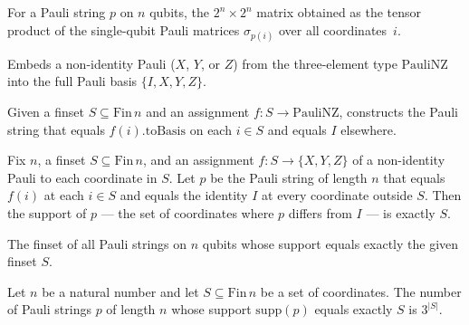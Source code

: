 \begin{definition}
\label{pauliMatrix}
\leanok
{}
For a Pauli string $p$ on $n$ qubits, the $2^n\times 2^n$ matrix obtained as the
tensor product of the single-qubit Pauli matrices $\sigma_{p(i)}$ over all coordinates~$i$.
\end{definition}

\begin{definition}
\label{PauliNZ.toBasis}
\leanok
{}
Embeds a non-identity Pauli ($X$, $Y$, or $Z$) from the three-element type
$\mathrm{PauliNZ}$ into the full Pauli basis $\{I,X,Y,Z\}$.
\end{definition}

\begin{definition}
\label{mkWithSupport}
\leanok
{}
Given a finset $S \subseteq \mathrm{Fin}\,n$ and an assignment $f : S \to \mathrm{PauliNZ}$,
constructs the Pauli string that equals $f(i).\mathrm{toBasis}$ on each $i \in S$ and equals $I$
elsewhere.
\end{definition}

\begin{lemma}
\label{support_mkWithSupport}
\leanok
{}
Fix $n$, a finset $S \subseteq \mathrm{Fin}\,n$, and an assignment $f : S \to \{X,Y,Z\}$
of a non-identity Pauli to each coordinate in $S$. Let $p$ be the Pauli string of length
$n$ that equals $f(i)$ at each $i \in S$ and equals the identity $I$ at every coordinate
outside $S$. Then the support of $p$ — the set of coordinates where $p$ differs from $I$
— is exactly $S$.
\end{lemma}

\begin{definition}
\label{pauliStringsExactSupport}
\leanok
{}
The finset of all Pauli strings on $n$ qubits whose support equals exactly the given
finset $S$.
\end{definition}

\begin{lemma}
\label{card_pauliStringsExactSupport}
\leanok
{}
Let $n$ be a natural number and let $S \subseteq \mathrm{Fin}\,n$ be a set of
coordinates. The number of Pauli strings $p$ of length $n$ whose support
$\mathrm{supp}(p)$ equals exactly $S$ is $3^{|S|}$.
\end{lemma}

